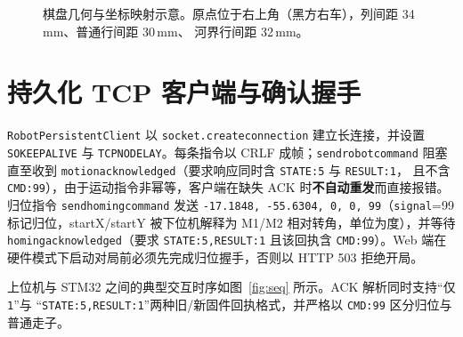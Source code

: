 \documentclass[UTF8, a4paper, 11pt, openany]{ctexbook}
\renewcommand{\_}{\textunderscore\allowbreak}
\begin{document}
\begin{figure}[H]
\centering
{}
\caption{棋盘几何与坐标映射示意。原点位于右上角（黑方右车），列间距 34\,mm、普通行间距 30\,mm、
河界行间距 32\,mm。}
\label{fig:geom}
\end{figure}

\section{持久化 TCP 客户端与确认握手}
\label{sec:handshake}
\texttt{RobotPersistentClient} 以 \texttt{socket.create\_connection} 建立长连接，并设置
\texttt{SO\_KEEPALIVE} 与 \texttt{TCP\_NODELAY}。每条指令以 CRLF 成帧；\texttt{send\_robot\_command}
阻塞直至收到 \texttt{motion\_acknowledged}（要求响应同时含 \texttt{STATE:5} 与 \texttt{RESULT:1}，
且不含 \texttt{CMD:99}），由于运动指令非幂等，客户端在缺失 ACK 时\textbf{不自动重发}而直接报错。
归位指令 \texttt{send\_homing\_command} 发送 \texttt{-17.1848, -55.6304, 0, 0, 99}（\texttt{signal}=99
标记归位，startX/startY 被下位机解释为 M1/M2 相对转角，单位为度），并等待
\texttt{homing\_acknowledged}（要求 \texttt{STATE:5,RESULT:1} 且该回执含 \texttt{CMD:99}）。Web 端在
硬件模式下启动对局前必须先完成归位握手，否则以 HTTP 503 拒绝开局。

上位机与 STM32 之间的典型交互时序如图~\ref{fig:seq} 所示。ACK 解析同时支持“仅 \texttt{1}”与
“\texttt{STATE:5,RESULT:1}”两种旧/新固件回执格式，并严格以 \texttt{CMD:99} 区分归位与普通走子。
\end{document}
